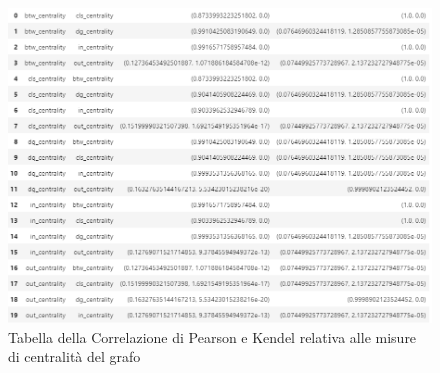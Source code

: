 \documentclass[a4paper,11pt]{report}
\begin{document}
\begin{figure}[ht]
	\centering
	\includegraphics[width=1\linewidth]{tabella}
	\caption[]{Tabella della Correlazione di Pearson e Kendel relativa alle misure di centralità del grafo}
\end{figure}
\end{document}
